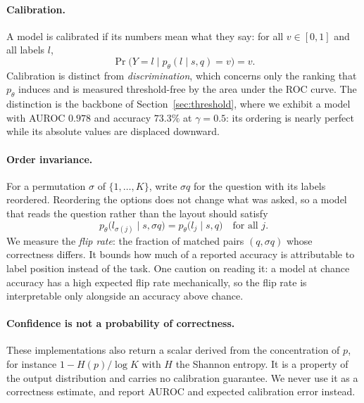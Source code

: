 \paragraph{Calibration.} A model is calibrated if its numbers mean what they say:
for all $v \in [0,1]$ and all labels $l$,
\begin{equation}
  \Pr\big(Y = l \;\big|\; p_\theta(l \mid s,q) = v\big) = v.
  \label{eq:calibration}
\end{equation}
Calibration is distinct from \emph{discrimination}, which concerns only the
ranking that $p_\theta$ induces and is measured threshold-free by the area under
the ROC curve. The distinction is the backbone of Section~\ref{sec:threshold},
where we exhibit a model with AUROC $0.978$ and accuracy $73.3\%$ at
$\gamma = 0.5$: its ordering is nearly perfect while its absolute values are
displaced downward.

\paragraph{Order invariance.} For a permutation $\sigma$ of $\{1,\dots,K\}$, write
$\sigma q$ for the question with its labels reordered. Reordering the options does
not change what was asked, so a model that reads the question rather than the
layout should satisfy
\begin{equation}
  p_\theta\big(l_{\sigma(j)} \mid s, \sigma q\big) = p_\theta\big(l_j \mid s, q\big)
  \quad \text{for all } j.
  \label{eq:orderinv}
\end{equation}
We measure the \emph{flip rate}: the fraction of matched pairs $(q, \sigma q)$
whose correctness differs. It bounds how much of a reported accuracy is
attributable to label position instead of the task. One caution on reading it:
a model at chance accuracy has a high expected flip rate mechanically, so the flip
rate is interpretable only alongside an accuracy above chance.

\paragraph{Confidence is not a probability of correctness.} These
implementations also return a scalar derived from the concentration of $p$, for
instance $1 - H(p)/\log K$ with $H$ the Shannon entropy. It is a property of the
output distribution and carries no calibration guarantee. We never use it as a
correctness estimate, and report AUROC and expected calibration error instead.
